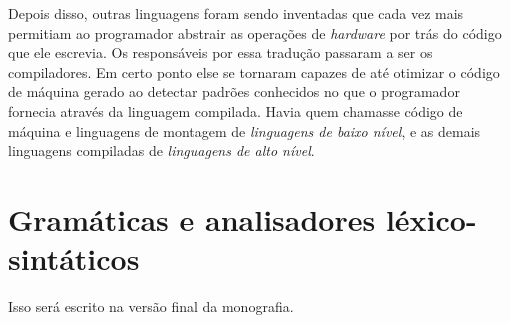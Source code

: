     Depois disso, outras linguagens foram sendo inventadas que cada vez mais
    permitiam ao programador abstrair as operações de \emph{hardware} por trás
    do código que ele escrevia. Os responsáveis por essa tradução passaram a ser
    os compiladores. Em certo ponto else se tornaram capazes de até otimizar o
    código de máquina gerado ao detectar padrões conhecidos no que o programador
    fornecia através da linguagem compilada. Havia quem chamasse código de máquina
    e linguagens de montagem de \emph{linguagens de baixo nível}, e as demais
    linguagens compiladas de \emph{linguagens de alto nível}.


  \section{Gramáticas e analisadores léxico-sintáticos}
  \label{cap:conceitos:gramaticas}

    Isso será escrito na versão final da monografia.

